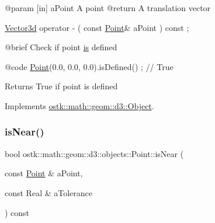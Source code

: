 \begin{DoxyCode}
    @param              [in] aPoint A point
    @\textcolor{keywordflow}{return}             A translation vector

\hyperlink{namespaceostk_1_1math_1_1obj_a18744cbf433bce59f6758d9fe3b1dff1}{Vector3d}                operator -                                  (   \textcolor{keyword}{const}   
      \hyperlink{classostk_1_1math_1_1geom_1_1d3_1_1objects_1_1_point_ad9bee5dadb878200f859b20a34680ae5}{Point}&                      aPoint                                      ) \textcolor{keyword}{const} ;

    @brief              Check \textcolor{keywordflow}{if} point \hyperlink{classostk_1_1math_1_1geom_1_1d3_1_1_object_ab09a0b47da3dc0ca2d8170aced1ead15}{is} defined
   
    @code
                        \hyperlink{classostk_1_1math_1_1geom_1_1d3_1_1objects_1_1_point_ad9bee5dadb878200f859b20a34680ae5}{Point}(0.0, 0.0, 0.0).isDefined() ; \textcolor{comment}{// True}
\end{DoxyCode}


\begin{DoxyReturn}{Returns}
True if point is defined 
\end{DoxyReturn}


Implements \hyperlink{classostk_1_1math_1_1geom_1_1d3_1_1_object_a271a1964cd208be85ce9a0a429395ad8}{ostk\+::math\+::geom\+::d3\+::\+Object}.

\mbox{\label{classostk_1_1math_1_1geom_1_1d3_1_1objects_1_1_point_abeeb9784820f7835e352cdbcd62c073a}} 
\subsubsection{\texorpdfstring{is\+Near()}{isNear()}}
{\footnotesize\ttfamily bool ostk\+::math\+::geom\+::d3\+::objects\+::\+Point\+::is\+Near (\begin{DoxyParamCaption}\item[{const \hyperlink{classostk_1_1math_1_1geom_1_1d3_1_1objects_1_1_point}{Point} \&}]{a\+Point,  }\item[{const Real \&}]{a\+Tolerance }\end{DoxyParamCaption}) const}



